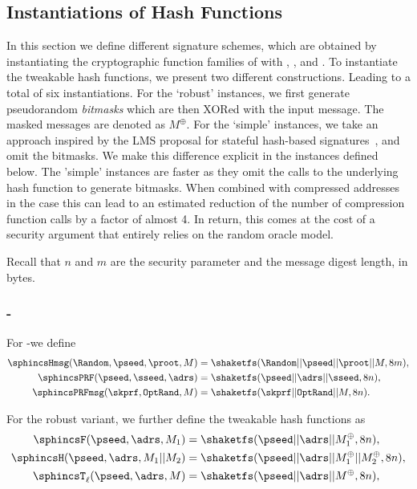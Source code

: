 

\subsection{Instantiations of Hash Functions}
\label{subsec:instanthash}
In this section we define different signature schemes, which are obtained 
by instantiating the cryptographic function families of \spx with \shatwo, 
\shathree, and \haraka. To instantiate the tweakable hash functions,
we present two different constructions. Leading to a total of six instantiations.
For the `robust' instances,
we first generate pseudorandom \emph{bitmasks}
which are then XORed with the input message. The masked messages are denoted
as $M^{\oplus}$.
For the `simple' instances, we take an approach inspired by the LMS proposal for stateful hash-based signatures~\cite{LMSdraft}, and omit the bitmasks.
We make this difference explicit in the instances defined below. The 'simple' instances 
are faster as they omit the calls to the underlying hash function to generate bitmasks. When combined with compressed addresses in the \shatwo case this can lead to an estimated reduction of the number of 
compression function calls by a factor of almost 4. In return, this comes at the cost of a 
security argument that entirely relies on the random oracle model. 

Recall that $n$ and $m$ are the security parameter and the message digest length, in bytes.

\subsubsection{\spx-\shathree}
   For \spx-\shathree we define
   \begin{equation}
      \begin{aligned}
         \sphincsHmsg(\Random,\pseed, \proot, M) &= \shaketfs(\Random || \pseed || \proot || M, 8m),\\
         \sphincsPRF(\pseed, \sseed, \adrs) &= \shaketfs(\pseed || \adrs || \sseed, 8n),\\
         \sphincsPRFmsg(\skprf, \texttt{OptRand}, M) &= \shaketfs(\skprf || \texttt{OptRand} || M, 8n).\\
      \end{aligned}
    \end{equation}

    For the robust variant, we further define the tweakable hash functions as
    \begin{equation}
      \begin{aligned}
         \sphincsF(\pseed, \adrs, M_1) &= \shaketfs(\pseed || \adrs || M_1^{\oplus}, 8n),\\
         \sphincsH(\pseed, \adrs, M_1 || M_2) &= \shaketfs(\pseed || \adrs || M_1^{\oplus} || M_2^{\oplus}, 8n),\\
         \sphincsT_\ell(\pseed, \adrs, M) &= \shaketfs(\pseed || \adrs || M^{\oplus}, 8n),\\
      \end{aligned}
    \end{equation}


